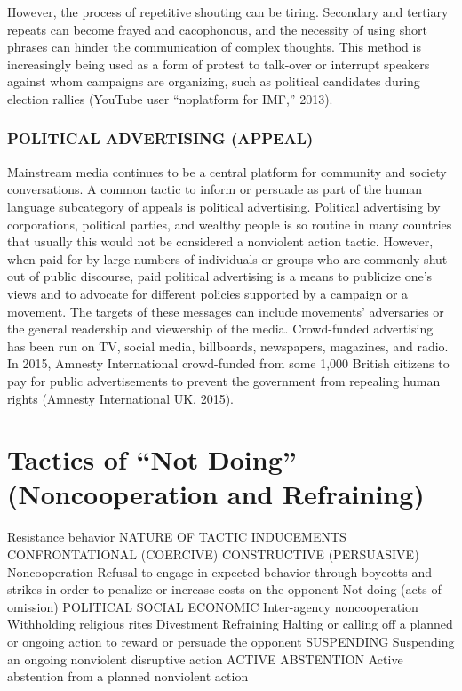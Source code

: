 \documentclass[twoside,a4paper,12pt,fleqn,openany]{extbook}
\begin{document}
However, the process of repetitive shouting can be tiring. Secondary and tertiary repeats can become frayed and cacophonous, and the necessity of using short phrases can hinder the communication of complex thoughts. This method is increasingly being used as a form of protest to talk-over or interrupt speakers against whom campaigns are organizing, such as political candidates during election rallies (YouTube user “noplatform for IMF,” 2013).

\subsubsection*{POLITICAL ADVERTISING (APPEAL)}

Mainstream media continues to be a central platform for community and society conversations. A common tactic to inform or persuade as part of the human language subcategory of appeals is political advertising. Political advertising by corporations, political parties, and wealthy people is so routine in many countries that usually this would not be considered a nonviolent action tactic. However, when paid for by large numbers of individuals or groups who are commonly shut out of public discourse, paid political advertising is a means to publicize one’s views and to advocate for different policies supported by a campaign or a movement. The targets of these messages can include movements’ adversaries or the general readership and viewership of the media. Crowd-funded advertising has been run on TV, social media, billboards, newspapers, magazines, and radio. In 2015, Amnesty International crowd-funded from some 1,000 British citizens to pay for public advertisements to prevent the government from repealing human rights (Amnesty International UK, 2015).

\section*{Tactics of “Not Doing” (Noncooperation and Refraining)}

Resistance behavior
NATURE OF TACTIC INDUCEMENTS
CONFRONTATIONAL (COERCIVE)
CONSTRUCTIVE (PERSUASIVE)
Noncooperation
Refusal to engage in expected behavior through boycotts and strikes in order to penalize or increase costs on the opponent
Not doing
(acts of omission)
POLITICAL
SOCIAL
ECONOMIC
Inter-agency noncooperation
Withholding religious rites
Divestment
Refraining
Halting or calling off a planned or ongoing action to reward or persuade the opponent
SUSPENDING
Suspending an ongoing nonviolent disruptive action
ACTIVE ABSTENTION
Active abstention from a planned nonviolent action
\end{document}
